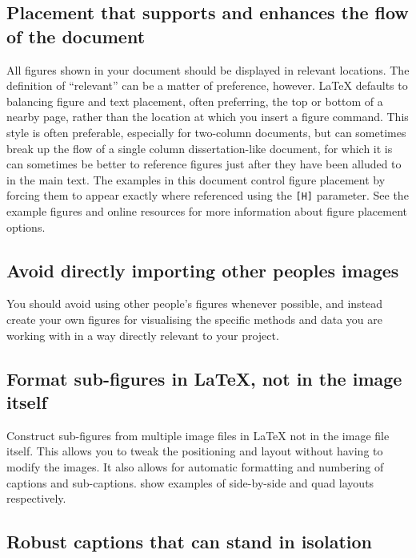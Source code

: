		


	\subsection{Placement that supports and enhances the flow of the document}

All figures shown in your document should be displayed in relevant locations.
The definition of ``relevant'' can be a matter of preference, however.
\LaTeX{} defaults to balancing figure and text placement, often preferring, \eg the top or bottom of a nearby page, rather than the location at which you insert a figure command.
This style is often preferable, especially for two-column documents, but can sometimes break up the flow of a single column dissertation-like document, for which it is can sometimes be better to reference figures just after they have been alluded to in the main text.
The examples in this document control figure placement by forcing them to appear exactly where referenced using the \lstinline|[H]| parameter.
See the example figures and online resources for more information about figure placement options.


	\subsection{Avoid directly importing other peoples images}

You should avoid using other people's figures whenever possible, and instead create your own figures for visualising the specific methods and data you are working with in a way directly relevant to your project. 


	\subsection{Format sub-figures in \LaTeX{}, not in the image itself}

Construct sub-figures from multiple image files in \LaTeX{} not in the image file itself.
This allows you to tweak the positioning and layout without having to modify the images.
It also allows for automatic formatting and numbering of captions and sub-captions.  show examples of side-by-side and quad layouts respectively.
		
		
		
		


	\subsection{Robust captions that can stand in isolation}

